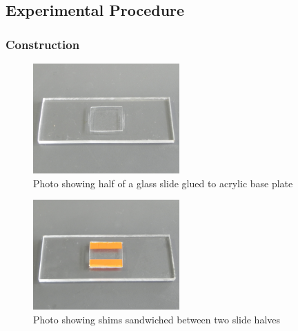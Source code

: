 \subsection{\label{sub:Experimental-Procedure}Experimental Procedure}


\subsubsection{Construction}

\begin{figure}[p]
\begin{centering}
\includegraphics[width=0.5\textwidth]{content/pt1/01-PowerHarvesting/Photo_streamingPotential_Assembly_Step1.JPG}
\par\end{centering}

\centering{}\protect\caption{\label{Photo_streamingPotential_Assembly_Step1}Photo showing half
of a glass slide glued to acrylic base plate}
\end{figure}
\begin{figure}[p]
\begin{centering}
\includegraphics[width=0.5\textwidth]{content/pt1/01-PowerHarvesting/Photo_streamingPotential_Assembly_Step2.JPG}
\par\end{centering}

\centering{}\protect\caption{\label{Photo_streamingPotential_Assembly_Step2}Photo showing shims
sandwiched between two slide halves}
\end{figure}
